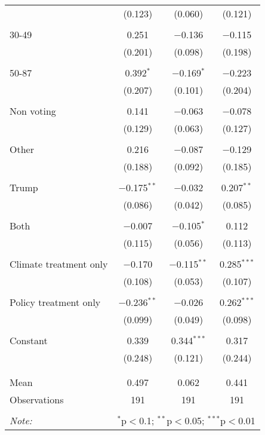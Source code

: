 \begin{tabular}{@{\extracolsep{5pt}}lccc}
  & (0.123) & (0.060) & (0.121) \\ 
  & & & \\ 
 30-49 & 0.251 & $-$0.136 & $-$0.115 \\ 
  & (0.201) & (0.098) & (0.198) \\ 
  & & & \\ 
 50-87 & 0.392$^{*}$ & $-$0.169$^{*}$ & $-$0.223 \\ 
  & (0.207) & (0.101) & (0.204) \\ 
  & & & \\ 
 Non voting & 0.141 & $-$0.063 & $-$0.078 \\ 
  & (0.129) & (0.063) & (0.127) \\ 
  & & & \\ 
 Other & 0.216 & $-$0.087 & $-$0.129 \\ 
  & (0.188) & (0.092) & (0.185) \\ 
  & & & \\ 
 Trump & $-$0.175$^{**}$ & $-$0.032 & 0.207$^{**}$ \\ 
  & (0.086) & (0.042) & (0.085) \\ 
  & & & \\ 
 Both & $-$0.007 & $-$0.105$^{*}$ & 0.112 \\ 
  & (0.115) & (0.056) & (0.113) \\ 
  & & & \\ 
 Climate treatment only & $-$0.170 & $-$0.115$^{**}$ & 0.285$^{***}$ \\ 
  & (0.108) & (0.053) & (0.107) \\ 
  & & & \\ 
 Policy treatment only & $-$0.236$^{**}$ & $-$0.026 & 0.262$^{***}$ \\ 
  & (0.099) & (0.049) & (0.098) \\ 
  & & & \\ 
 Constant & 0.339 & 0.344$^{***}$ & 0.317 \\ 
  & (0.248) & (0.121) & (0.244) \\ 
  & & & \\ 
\hline \\[-1.8ex] 
Mean & 0.497 & 0.062 & 0.441 \\ 
Observations & 191 & 191 & 191 \\ 
\hline 
\hline \\[-1.8ex] 
\textit{Note:}  & \multicolumn{3}{r}{$^{*}$p$<$0.1; $^{**}$p$<$0.05; $^{***}$p$<$0.01} \\ 
\end{tabular} 
